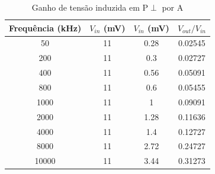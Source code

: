 \documentclass[12pt]{article}
\begin{document}
\begin{table}[h]
  \centering
  \begin{tabular}{c|c|c|c}
    \toprule
    \textbf{Frequência (kHz)} & \textbf{$V_{in}$ (mV)} &
    \textbf{$V_{in}$ (mV)} & \textbf{${V_{out}}/{V_{in}}$} \\
    \midrule
    50    &11  &0.28  &0.02545 \\
    200    &11  &0.3    &0.02727 \\
    400    &11  &0.56  &0.05091 \\
    800    &11  &0.6    &0.05455 \\
    1000  &11  &1      &0.09091 \\
    2000  &11  &1.28  &0.11636 \\
    4000  &11  &1.4    &0.12727 \\
    8000  &11  &2.72  &0.24727 \\
    10000  &11  &3.44  &0.31273 \\
    \bottomrule
  \end{tabular}
  \caption{Ganho de tensão induzida em P$\perp$ por A}
  \label{tab:ganho-tensao-pperp}
\end{table}
\end{document}
